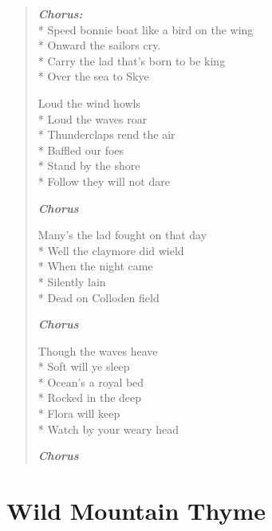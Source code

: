 \documentclass[9pt,twoside]{extarticle}
\newenvironment{xverse}{
	\begin{verse}
	\fontsize{8.5}{10.5}\selectfont
	}
	{
	\end{verse}
	\penalty 0
}
\newcommand{\chorusdef}{\textbf{\emph{Chorus:}}\\*}
\newcommand{\chorusmark}[1][1]{%
\vspace{-0.5\stanzaskip}%
\textbf{\emph{Chorus \ifthenelse{\equal{#1}{1}}{}{$\times$ #1}}}%
\vspace{-0.5\stanzaskip}%
}
\begin{document}
\begin{xverse}
\chorusdef
Speed bonnie boat like a bird on the wing \\*
Onward the sailors cry. \\*
Carry the lad that’s born to be king \\*
Over the sea to Skye

Loud the wind howls \\*
Loud the waves roar \\*
Thunderclaps rend the air \\*
Baffled our foes \\*
Stand by the shore \\*
Follow they will not dare

\chorusmark

Many’s the lad fought on that day \\*
Well the claymore did wield \\*
When the night came \\*
Silently lain \\*
Dead on Colloden field

\chorusmark

Though the waves heave \\*
Soft will ye sleep \\*
Ocean’s a royal bed \\*
Rocked in the deep \\*
Flora will keep \\*
Watch by your weary head

\chorusmark
\end{xverse}

\section{Wild Mountain Thyme}
\end{document}
